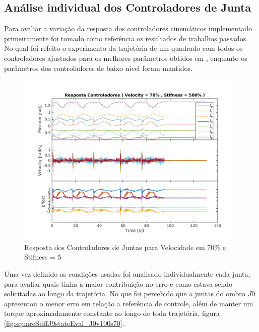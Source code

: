 \subsection{Análise individual dos Controladores de Junta}

Para avaliar a variação da resposta dos controladores cinemáticos implementado primeiramente foi tomado como referência os resultados de trabalhos passados. No qual foi refeito o experimento da trajetória de um quadrado com todos os controladores ajustados para os melhores parâmetros obtidos em \cite{marcosps2016}, enquanto os parâmetros dos controladores de baixo nível foram mantidos.

\begin{figure}[H]
    \centering
    \includegraphics[width=0.8\linewidth,trim={2cm 1cm 2cm 2cm}]{tex/figs/squareStifff4stateEvalv70s500.png}
    \caption{Resposta dos Controladores de Juntas para Velocidade em $70\%$ e Stifness = $5$ }
    \label{fig:squareStiffMarcos}
\end{figure}

Uma vez definido as condições usadas foi analisado individualmente cada junta, para avaliar quais tinha a maior contribuição no erro e como estava sendo solicitadas ao longo da trajetória. No que foi percebido que a juntas do ombro $J0$ apresentou o menor erro em relação a referência de controle, além de manter um torque aproximadamente constante ao longo de toda trajetória, figura \ref{fig:squareStiffJ9stateEval_J0v100s70}.

\vspace{1cm}

